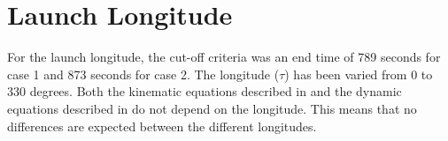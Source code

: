 
%



%
% 


\section{Launch Longitude}
\label{sec:launchLongitude}
For the launch longitude, the cut-off criteria was an end time of 789 seconds for case 1 and 873 seconds for case 2. The longitude ($\tau$) has been varied from 0 to 330 degrees. Both the kinematic equations described in  and the dynamic equations described in  do not depend on the longitude. This means that no differences are expected between the different longitudes. \\

